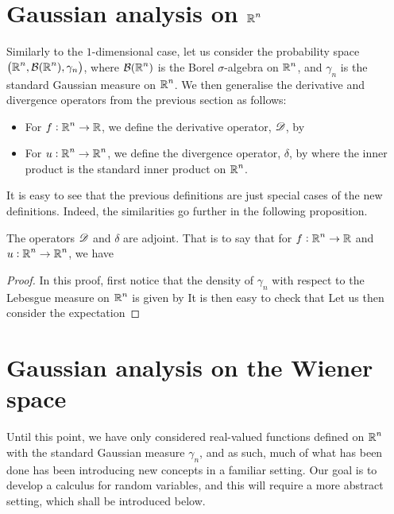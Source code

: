 \documentclass[../main.tex]{subfiles}
\begin{document}
\section{Gaussian analysis on \texorpdfstring{$\operatorname{\mathbb{R}}^n$}{Rn}}
Similarly to the $1$-dimensional case, let us consider the probability space $\del{\R^n,\Bor(\R^n),\gamma_n}$, where $\mathcal{B}(\operatorname{\mathbb{R}}^n)$ is the Borel $\sigma$-algebra on $\operatorname{\mathbb{R}}^n$, and $\gamma_n$ is the standard Gaussian measure on $\operatorname{\mathbb{R}}^n$. We then generalise the derivative and divergence operators from the previous section as follows:
\begin{itemize}
    \item For $f:\operatorname{\mathbb{R}}^n\to\operatorname{\mathbb{R}}$, we define the derivative operator, $\mathscr{D}$, by 
    \item For $u:\operatorname{\mathbb{R}}^n\to\operatorname{\mathbb{R}}^n$, we define the divergence operator, $\delta$, by  where the inner product is the standard inner product on $\operatorname{\mathbb{R}}^n$.
\end{itemize}
It is easy to see that the previous definitions are just special cases of the new definitions. Indeed, the similarities go further in the following proposition.
\begin{proposition}
\label{prop:nd_adjoint}
The operators $\mathscr{D}$ and $\delta$ are adjoint. That is to say that for $f:\operatorname{\mathbb{R}}^n\to\operatorname{\mathbb{R}}$ and $u:\operatorname{\mathbb{R}}^n\to\operatorname{\mathbb{R}}^n$, we have 
\end{proposition}
\begin{proof}
In this proof, first notice that the density of $\gamma_n$ with respect to the Lebesgue measure on $\operatorname{\mathbb{R}}^n$ is given by  It is then easy to check that  Let us then consider the expectation 
\end{proof}

\section{Gaussian analysis on the Wiener space}
Until this point, we have only considered real-valued functions defined on $\operatorname{\mathbb{R}}^n$ with the standard Gaussian measure $\gamma_n$, and as such, much of what has been done has been introducing new concepts in a familiar setting. Our goal is to develop a calculus for random variables, and this will require a more abstract setting, which shall be introduced below.
\end{document}
